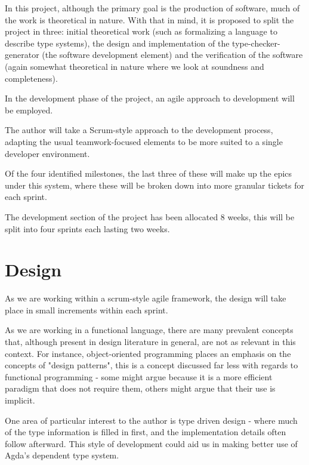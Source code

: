 \documentclass{ProgressReport}[2020/09/15]
\begin{document}
        In this project, although the primary goal is the production
        of software, much of the work is theoretical in nature. With
        that in mind, it is proposed to split the project in three:
        initial theoretical work (such as formalizing a language to
        describe type systems), the design and implementation of the
        type-checker-generator (the software development element) and
        the verification of the software (again somewhat theoretical
        in nature where we look at soundness and completeness).
        
        In the development phase of the project, an agile approach to
        development will be employed. 

        The author will take a Scrum-style approach to the development
        process, adapting the usual teamwork-focused elements to be
        more suited to a single developer environment.

        Of the four identified milestones, the last three of these
        will make up the epics under this system, where these will be
        broken down into more granular tickets for each sprint.

        The development section of the project has been allocated 8
        weeks, this will be split into four sprints each lasting two
        weeks. 
        
        \section{Design}

        As we are working within a scrum-style agile framework, the
        design will take place in small increments within each
        sprint.

        As we are working in a functional language, there are many
        prevalent concepts that, although present in design literature
        in general, are not as relevant in this context. For
        instance, object-oriented programming places an emphasis on
        the concepts of "design patterns", this is a concept discussed
        far less with regards to functional programming - some might
        argue because it is a more efficient paradigm that does not
        require them, others might argue that their use is implicit.

        One area of particular interest to the author is type driven
        design - where much of the type information is filled in
        first, and the implementation details often follow
        afterward. This style of development could aid us in making
        better use of Agda's dependent type system.
\end{document}
